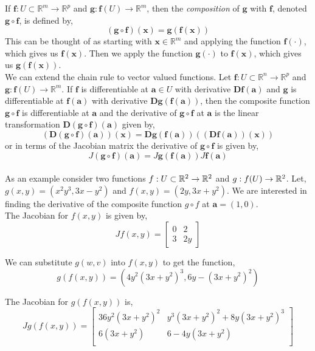 \documentclass[12pt]{article}
\begin{document}
 If $\mathbf{f}:U\subset\mathbb{R}^m\rightarrow\mathbb{R}^p$ and $\mathbf{g}:\mathbf{f}(U)\rightarrow\mathbb{R}^m$, then the \emph{composition} of $\mathbf{g}$ with $\mathbf{f}$, denoted $\mathbf{g}\circ\mathbf{f}$, is defined by,
\[
(\mathbf{g}\circ\mathbf{f})(\mathbf{x}) = \mathbf{g(f(x))}
\]
This can be thought of as starting with $\mathbf{x}\in\mathbb{R}^m$ and applying the function $\mathbf{f}(\cdot)$, which gives us $\mathbf{f(x)}$. Then we apply the function $\mathbf{g}(\cdot)$ to $\mathbf{f(x)}$, which gives us $\mathbf{g(f(x))}$. \\

 We can extend the chain rule to vector valued functions. Let $\mathbf{f}:U\subset\mathbb{R}^n\rightarrow\mathbb{R}^p$ and $\mathbf{g}:\mathbf{f}(U)\rightarrow\mathbb{R}^m$. If $\mathbf{f}$ is differentiable at $\mathbf{a}\in U$ with derivative $\mathbf{Df(a)}$ and $\mathbf{g}$ is differentiable at $\mathbf{f(a)}$ with derivative $\mathbf{Dg(f(a))}$, then the composite function $\mathbf{g}\circ\mathbf{f}$ is differentiable at $\mathbf{a}$ and the derivative of $\mathbf{g}\circ\mathbf{f}$ at $\mathbf{a}$ is the linear transformation $\mathbf{D(g\circ f)(a)}$ given by,
\[
\mathbf{(D(g\circ f)(a))(x) = Dg(f(a))((Df(a))(x)) }
\]
or in terms of the Jacobian matrix the derivative of $\mathbf{g\circ f}$ is given by,
\[
J(\mathbf{g\circ f})(\mathbf{a}) = J\mathbf{g(f(a))}J\mathbf{f(a)}
\] \\

 As an example consider two functions $f:U\subset\mathbb{R}^2\rightarrow\mathbb{R}^2$ and $g:f(U)\rightarrow\mathbb{R}^2$. Let, $g(x,y) = (x^2y^3, 3x-y^2)$ and $f(x,y) = (2y, 3x+y^2)$. We are interested in finding the derivative of the composite function $g\circ f$ at $\mathbf{a}=(1,0)$.\\

 The Jacobian for $f(x,y)$ is given by,
\[
Jf(x,y) = 
\begin{bmatrix}
0 & 2 \\
3  & 2y
\end{bmatrix}
\]

 We can substitute $g(w,v)$ into $f(x,y)$ to get the function,
\[
g(f(x,y)) = (4y^2(3x+y^2)^3, 6y-(3x+y^2)^2)
\] 

 The Jacobian for $g(f(x,y))$ is,
\[
Jg(f(x,y)) = 
\begin{bmatrix}
36y^2(3x+y^2)^2 & y^3(3x+y^2)^2 + 8y(3x+y^2)^3 \\
6(3x+y^2) & 6 - 4y(3x+y^2) \\
\end{bmatrix}
\]
\end{document}
